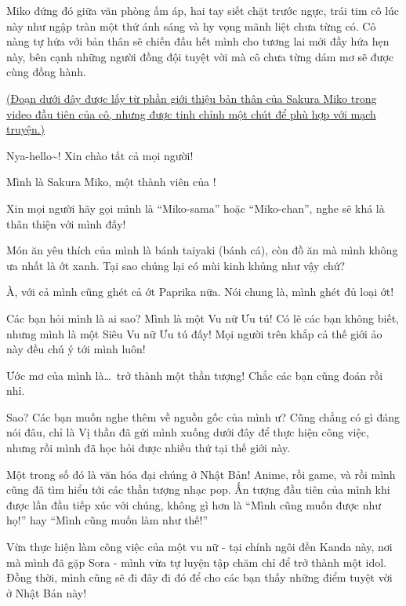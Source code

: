\documentclass[../main.tex]{subfiles}
\begin{document}
Miko đứng đó giữa văn phòng ấm áp, hai tay siết chặt trước ngực, trái tim cô lúc này như ngập tràn một thứ ánh sáng và hy vọng mãnh liệt chưa từng có. Cô nàng tự hứa với bản thân sẽ chiến đấu hết mình cho tương lai mới đầy hứa hẹn này, bên cạnh những người đồng đội tuyệt vời mà cô chưa từng dám mơ sẽ được cùng đồng hành.

\omk

\begin{center}
  \uline{(Đoạn dưới đây được lấy từ phần giới thiệu bản thân của Sakura Miko trong video đầu tiên của cô, nhưng được tinh chỉnh một chút để phù hợp với mạch truyện.)}
\end{center}


Nya-hello\~{}! Xin chào tất cả mọi người!

Mình là Sakura Miko, một thành viên của \hll!

Xin mọi người hãy gọi mình là ``Miko-sama'' hoặc ``Miko-chan'', nghe sẽ khá là thân thiện với mình đấy!

Món ăn yêu thích của mình là bánh taiyaki (bánh cá), còn đồ ăn mà mình không ưa nhất là ớt xanh. Tại sao chúng lại có mùi kinh khủng như vậy chứ?

À, với cả  mình cũng ghét cả ớt Paprika nữa. Nói chung là, mình ghét đủ loại ớt!

Các bạn hỏi mình là ai sao? Mình là một Vu nữ Ưu tú! Có lẽ các bạn không biết, nhưng mình là một Siêu Vu nữ Ưu tú đấy! Mọi người trên khắp cả thế giới ảo này đều chú ý tới mình luôn!

Ước mơ của mình là\dots\ trở thành một thần tượng! Chắc các bạn cũng đoán rồi nhỉ.

Sao? Các bạn muốn nghe thêm về nguồn gốc của mình ư? Cũng chẳng có gì đáng nói đâu, chỉ là Vị thần đã gửi mình xuống dưới đây để thực hiện công việc, nhưng rồi mình đã học hỏi được nhiều thứ tại thế giới này.

Một trong số đó là văn hóa đại chúng ở Nhật Bản! Anime, rồi game, và rồi mình cũng đã tìm hiểu tới các thần tượng nhạc pop. Ấn tượng đầu tiên của mình khi được lần đầu tiếp xúc với chúng, không gì hơn là ``Mình cũng muốn được như họ!'' hay ``Mình cũng muốn làm như thế!''

Vừa thực hiện làm công việc của một vu nữ - tại chính ngôi đền Kanda này, nơi mà mình đã gặp Sora - mình vừa tự luyện tập chăm chỉ để trở thành một idol. Đồng thời, mình cũng sẽ đi đây đi đó để cho các bạn thấy những điểm tuyệt vời ở Nhật Bản này!
\end{document}
